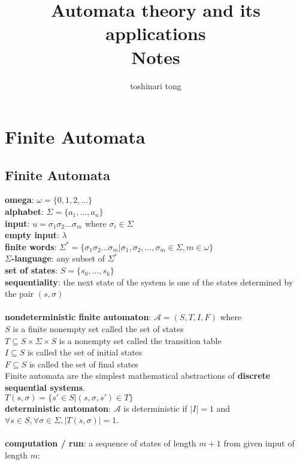 \documentclass{article}
\title{Automata theory and its applications\\Notes}
\author{toshinari tong}
\begin{document}
\maketitle
\section{Finite Automata}
\subsection{Finite Automata}
\textbf{omega}: \(\omega=\{0,1,2,...\}\)\\
\textbf{alphabet}: \(\Sigma=\{a_{1},...,a_{n}\}\)\\
\textbf{input}: \(u=\sigma_{1}\sigma_{2}...\sigma_{m}\) where \(\sigma_{i}\in\Sigma\)\\
\textbf{empty input}: \(\lambda\)\\
\textbf{finite words}: \(\Sigma^{*}=\{\sigma_{1}\sigma_{2}...\sigma_{m}|\sigma_{1},\sigma_{2},...,\sigma_{m}\in\Sigma,m\in\omega\}\)\\
\textbf{\(\Sigma\)-language}: any subset of \(\Sigma^{*}\)\\
\textbf{set of states}: \(S=\{s_{0},...,s_{k}\}\)\\
\textbf{sequentiality}: the next state of the system is one of the states determined by the pair \((s,\sigma)\)\\
\\
\textbf{nondeterministic finite automaton}: \(\mathcal{A}=(S,T,I,F)\) where\\
\null\qquad \(S\) is a finite nonempty set called the set of states\\
\null\qquad \(T\subseteq S\times\Sigma\times S\) is a nonempty set called the transition table\\
\null\qquad \(I\subseteq S\) is called the set of initial states\\
\null\qquad \(F\subseteq S\) is called the set of final states\\
Finite automata are the simplest mathematical abstractions of \textbf{discrete sequential systems}.\\
\(T(s,\sigma)=\{s'\in S|(s,\sigma,s')\in T\}\)\\
\textbf{deterministic automaton}: \(\mathcal{A}\) is deterministic if \(|I|=1\) and \(\forall s\in S,\forall\sigma\in\Sigma,|T(s,\sigma)|=1\).\\
\\
\textbf{computation / run}: a sequence of states of length \(m+1\) from given input of length \(m\):\\
\end{document}
